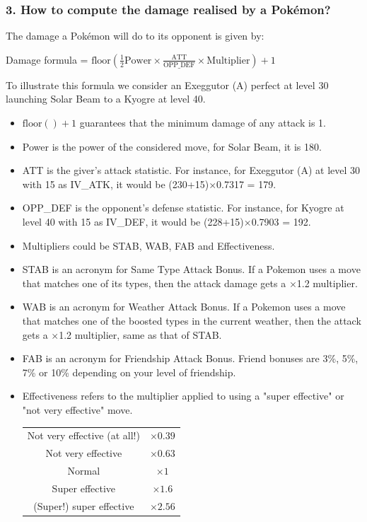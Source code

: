 \documentclass[12pt]{beamer}
\begin{document}
\begin{frame}
\frametitle{3. How to compute the damage realised by a Pokémon?}

\begin{block}{}
\begin{footnotesize}
The damage a Pok\'emon will do to its opponent is given by:
\begin{center}
Damage formula = $\text{floor}\left(\frac{1}{2}\text{Power} \times \frac{\text{ATT}}{\text{OPP\_DEF}}\times\text{Multiplier}\right) +1$
\end{center}

To illustrate this formula we consider an Exeggutor (A) perfect at level 30 launching Solar Beam to a Kyogre at level 40.
\begin{itemize}
  \item $\text{floor}\left(\right)+1$ guarantees that the minimum damage of any attack is 1.
  \item Power is the power of the considered move, for Solar Beam, it is 180.
  \item ATT is the giver's attack statistic. For instance, for Exeggutor (A) at level 30 with 15 as IV\_ATK, it would be (230+15)$\times$0.7317 = 179.
  \item OPP\_DEF is the opponent's defense statistic. For instance, for Kyogre at level 40 with 15 as IV\_DEF, it would be (228+15)$\times$0.7903 = 192.
  \item Multipliers could be STAB, WAB, FAB and Effectiveness.
  \item STAB is an acronym for Same Type Attack Bonus. If a Pokemon uses a move that matches one of its types, then the attack damage gets a $\times$1.2 multiplier.
  \item WAB is an acronym for Weather Attack Bonus. If a Pokemon uses a move that matches one of the boosted types in the current weather, then the attack gets a $\times$1.2 multiplier, same as that of STAB.
  \item FAB is an acronym for Friendship Attack Bonus. Friend bonuses are 3\%, 5\%, 7\% or 10\% depending on your level of friendship.
  \item Effectiveness refers to the multiplier applied to using a "super effective" or "not very effective" move.  

\begin{center}
\begin{tabular}{cc}
Not very effective (at all!) & $\times 0.39$ \\
Not very effective & $\times 0.63$ \\
Normal & $\times 1$ \\
Super effective & $\times 1.6$  \\ 
(Super!) super effective & $\times 2.56$ \\
\end{tabular} 
\end{center}
\end{itemize}


\end{footnotesize}
\end{block}
\end{frame}
\end{document}
